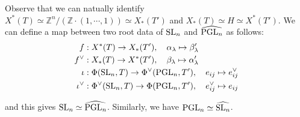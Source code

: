 \begin{problem}
Observe that we can natually identify $X^{*}(T) \simeq \mathbb{Z}^{n}/(\mathbb{Z} \cdot (1, \cdots, 1)) \simeq X_{*}(T')$ and $X_{*}(T) \simeq H \simeq  X^{*}(T')$.
We can define a map between two root data of $\operatorname{\mathrm{SL}}_n$ and $\widehat{\operatorname{\mathrm{PGL}}_n}$ as follows:
\begin{align*}
    f&:X^{*}(T)\to X_{*}(T'), \quad \alpha_{\lambda} \mapsto \beta_{\lambda}' \\
    f^{\vee}&: X_{*}(T) \to X^{*}(T'), \quad \beta_{\lambda} \mapsto \alpha_{\lambda}' \\
    \iota&: \Phi(\operatorname{\mathrm{SL}}_n, T) \to \Phi^{\vee}(\operatorname{\mathrm{PGL}}_n, T'), \quad e_{ij} \mapsto e_{ij}^{\vee} \\
    \iota^{\vee}&: \Phi^{\vee}(\operatorname{\mathrm{SL}}_n, T) \to \Phi(\operatorname{\mathrm{PGL}}_n, T'), \quad e_{ij}^{\vee} \mapsto e_{ij}
\end{align*}
\end{problem}
and this gives $\operatorname{\mathrm{SL}}_n \simeq \widehat{\operatorname{\mathrm{PGL}}_n}$.
Similarly, we have $\operatorname{\mathrm{PGL}}_n \simeq \widehat{\operatorname{\mathrm{SL}}_n}$.

\begin{problem} \notfinish
\end{problem}
